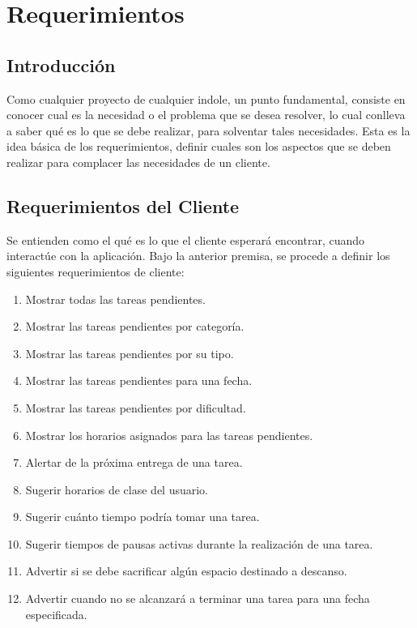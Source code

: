 \chapter{Requerimientos}
\section{Introducción}
Como cualquier proyecto de cualquier indole, un punto fundamental, consiste en conocer cual es la necesidad o el problema que se desea resolver, lo cual conlleva a saber qué es lo que se debe realizar, para solventar tales necesidades. Esta es la idea básica de los requerimientos, definir cuales son los aspectos que se deben realizar para complacer las necesidades de un cliente.
\newpage

\section{Requerimientos del Cliente}
Se entienden como el qué es lo que el cliente esperará encontrar, cuando interactúe con la aplicación. Bajo la anterior premisa, se procede a definir los siguientes requerimientos de cliente:

\begin{enumerate}
	\item Mostrar todas las tareas pendientes.
	\item Mostrar las tareas pendientes por categoría.
	\item Mostrar las tareas pendientes por su tipo.
	\item Mostrar las tareas pendientes para una fecha.
	\item Mostrar las tareas pendientes por dificultad.
	\item Mostrar los horarios asignados para las tareas pendientes.
	\item Alertar de la próxima entrega de una tarea.
	\item Sugerir horarios de clase del usuario.
	\item Sugerir cuánto tiempo podría tomar una tarea.
	\item Sugerir tiempos de pausas activas durante la realización de una tarea.
	\item Advertir si se debe sacrificar algún espacio destinado a descanso.
	\item Advertir cuando no se alcanzará a terminar una tarea para una fecha especificada.
\end{enumerate}